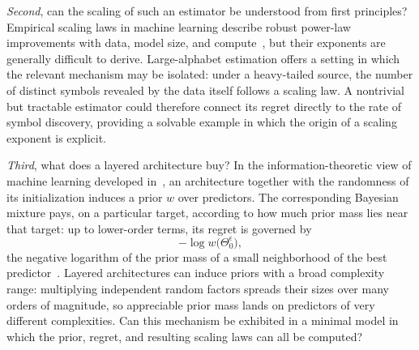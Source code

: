 \documentclass[11pt]{article}
\begin{document}
\emph{Second}, can the scaling of such an estimator be understood from
first principles?
Empirical scaling laws in machine learning describe robust power-law
improvements with data, model size, and compute~\cite{kaplan2020scaling},
but their exponents are generally difficult to derive.
Large-alphabet estimation offers a setting in which the relevant mechanism
may be isolated: under a heavy-tailed source, the number of distinct symbols
revealed by the data itself follows a scaling law.
A nontrivial but tractable estimator could therefore connect its regret
directly to the rate of symbol discovery, providing a solvable example in
which the origin of a scaling exponent is explicit.

\emph{Third}, what does a layered architecture buy?
In the information-theoretic view of machine learning developed
in~\cite{feder2025framework}, an architecture together with the randomness
of its initialization induces a prior \(w\) over predictors.
The corresponding Bayesian mixture pays, on a particular target, according
to how much prior mass lies near that target: up to lower-order terms, its
regret is governed by
\[
    -\log w\bigl(\Theta_0^\epsilon\bigr),
\]
the negative logarithm of the prior mass of a small neighborhood of the
best predictor~\cite{feder1992universal,MerhavFeder1998,
feder2025framework}.
Layered architectures can induce priors with a broad complexity range:
multiplying independent random factors spreads their sizes over many
orders of magnitude, so appreciable prior mass lands on predictors of
very different complexities.
Can this mechanism be exhibited in a minimal model in which the prior,
regret, and resulting scaling laws can all be computed?
\end{document}
